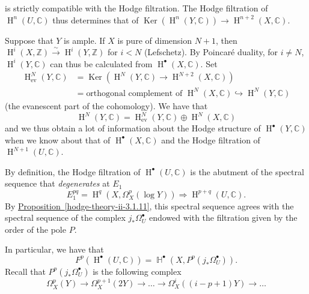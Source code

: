     is strictly compatible with the Hodge filtration.
    The Hodge filtration of \(\operatorname {H}^n(U,\mathbb {C})\) thus determines that of \(\operatorname {Ker}(\operatorname {H}^n(Y,\mathbb {C}))\to \operatorname {H}^{n+2}(X,\mathbb {C})\).\par{}Suppose that \(Y\) is ample.
    If \(X\) is pure of dimension \(N+1\), then \(\operatorname {H}^i(X,\mathbb {Z})\xrightarrow {\sim }\operatorname {H}^i(Y,\mathbb {Z})\) for \(i<N\) (Lefschetz).
    By Poincaré duality, for \(i\neq  N\), \(\operatorname {H}^i(Y,\mathbb {C})\) can thus be calculated from \(\operatorname {H}^\bullet (X,\mathbb {C})\).
    Set
    \[       \begin {aligned}         \operatorname {H}_\mathrm {ev}^N(Y,\mathbb {C})         &= \operatorname {Ker}(\operatorname {H}^N(Y,\mathbb {C})\to \operatorname {H}^{N+2}(X,\mathbb {C}))       \\&= \text {orthogonal complement of }\operatorname {H}^N(X,\mathbb {C})\hookrightarrow \operatorname {H}^N(Y,\mathbb {C})       \end {aligned}     \]
    (the evanescent part of the cohomology).
    We have that
    \[       \operatorname {H}^N(Y,\mathbb {C})       = \operatorname {H}_\mathrm {ev}^N(Y,\mathbb {C})\oplus \operatorname {H}^N(X,\mathbb {C})     \]
    and we thus obtain a lot of information about the Hodge structure of \(\operatorname {H}^\bullet (Y,\mathbb {C})\) when we know about that of \(\operatorname {H}^\bullet (X,\mathbb {C})\) and the Hodge filtration of \(\operatorname {H}^{N+1}(U,\mathbb {C})\).\label{hodge-theory-iii-9.2.3}\par{}By definition, the Hodge filtration of \(\operatorname {H}^\bullet (U,\mathbb {C})\) is the abutment of the spectral sequence that \emph{degenerates} at \(E_1\)
    \[       E_1^{pq}       = \operatorname {H}^q(X,\Omega _X^p(\log  Y))       \Rightarrow  \operatorname {H}^{p+q}(U,\mathbb {C}).     \]
    By \hyperref[hodge-theory-ii-3.1.11]{Proposition~\ref*{hodge-theory-ii-3.1.11}}, this spectral sequence agrees with the spectral sequence of the complex \(j_*\Omega _U^\bullet \) endowed with the filtration given by the order of the pole \(P\).\par{}In particular, we have that
    \[       F^p(\operatorname {H}^\bullet (U,\mathbb {C}))       = \operatorname {\mathbb {H}}^\bullet (X,P^p(j_*\Omega _U^\bullet )).     \]
    Recall that \(P^p(j_*\Omega _U^\bullet )\) is the following complex
    \[       \Omega _X^p(Y)       \to  \Omega _X^{p+1}(2Y)       \to  \ldots        \to  \Omega _X^i((i-p+1)Y)       \to  \ldots      \]
